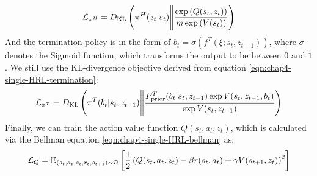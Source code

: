 \begin{equation}
    \mathcal{L}_{\pi^H} = D_{\mathrm{KL}}\left( \pi^H(z_t | s_t) \Bigg\| \frac{\exp\left( Q(s_t, z_t) \right)}{m\exp\left( V(s_t) \right)} \right)
\end{equation}
And the termination policy is in the form of $b_t = \sigma(f^T(\xi ; s_t, z_{t-1}))$, where $\sigma$ denotes the Sigmoid function, which transforms the output to be between $0$ and $1$. We still use the KL-divergence objective derived from equation \ref{eqn:chap4-single-HRL-termination}:
\begin{equation}
    \mathcal{L}_{\pi^T} = D_{\mathrm{KL}}\left( \pi^T(b_t | s_t, z_{t-1}) \Bigg\| \frac{P_{\text{prior}}^T(b_{t} | s_{t}, z_{t-1})\exp{V(s_{t}, z_{t-1}, b_{t})}}{\exp V(s_{t}, z_{t-1})}  \right)
\end{equation}
Finally, we can train the action value function $Q(s_t, a_t, z_t)$, which is calculated via the Bellman equation \ref{eqn:chap4-single-HRL-bellman} as:
\begin{equation}
    \mathcal{L}_Q = \mathbb{E}_{(s_t, a_t, z_t, r_t, s_{t+1}) \sim \mathcal{D}}\left[ \frac{1}{2}\left( Q(s_t, a_t, z_t) - \beta r(s_t, a_t) + \gamma V(s_{t+1}, z_t) \right)^2 \right]
\end{equation}

